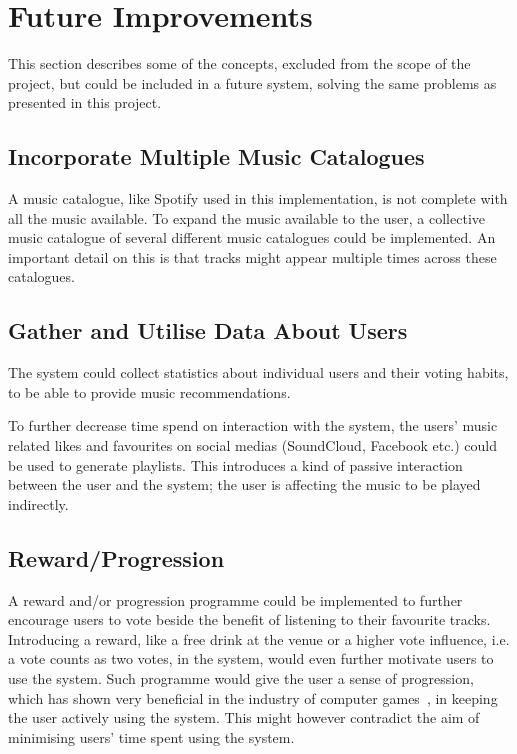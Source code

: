 \section{Future Improvements}
\label{future}

This section describes some of the concepts, excluded from the scope of the project, but could be included in a future system, solving the same problems as presented in this project. 

\subsection{Incorporate Multiple Music Catalogues}
A music catalogue, like Spotify used in this implementation, is not complete with all the music available. To expand the music available to the user, a collective music catalogue of several different music catalogues could be implemented. An important detail on this is that tracks might appear multiple times across these catalogues.

\subsection{Gather and Utilise Data About Users}
The system could collect statistics about individual users and their voting habits, to be able to provide music recommendations.

To further decrease time spend on interaction with the system, the users' music related likes and favourites on social medias (SoundCloud, Facebook etc.) could be used to generate playlists. This introduces a kind of passive interaction between the user and the system; the user is affecting the music to be played indirectly.

\subsection{Reward/Progression}
A reward and/or progression programme could be implemented to further encourage users to vote beside the benefit of listening to their favourite tracks. Introducing a reward, like a free drink at the venue or a higher vote influence, i.e. a vote counts as two votes, in the system, would even further motivate users to use the system. Such programme would give the user a sense of progression, which has shown very beneficial in the industry of computer games~\cite{games}, in keeping the user actively using the system. This might however contradict the aim of minimising users' time spent using the system.

